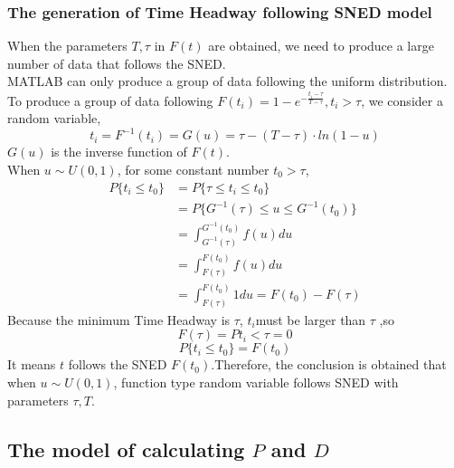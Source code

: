 \documentclass{mcmthesis}
\begin{document}
\subsubsection{The generation of Time Headway following SNED model}
\indent When the parameters $T, \tau $ in $F(t)$ are obtained, we need to produce a large number of data that follows the SNED.\\
\indent MATLAB can only produce a group of data following the uniform distribution. To produce a group of data following $ F(t_{i})=1-e^{-\frac{t_{i}-\tau}{T-\tau}},t_{i}>\tau $, we consider a random variable, 
\begin{equation}
	t_{i}=F^{-1}(t_{i})=G(u)=\tau-(T-\tau)\cdot ln(1-u)
\end{equation}
\indent $G(u)$ is the inverse function of $F(t)$.\\
\indent When $ u \sim U(0,1) $, for some constant number $t_{0}>\tau$,\\
\begin{equation}
\begin{split}
	P\{t_{i}\leqslant t_{0}\}&=P\{\tau\leqslant t_{i} \leqslant t_{0} \}\\
&=P\{ G^{-1}(\tau)\leqslant u \leqslant G^{-1}(t_{0})\}\\
&=\int_{G^{-1}(\tau)}^{G^{-1}(t_{0})}f(u)du\\
&=\int_{F(\tau)}^{F(t_{0})}f(u)du\\
&=\int_{F(\tau)}^{F(t_{0})}1du=F(t_{0})-F(\tau)
\end{split}
\end{equation}
\indent Because the minimum Time Headway is $\tau$, $ t_{i} $must be larger than $\tau$ ,so\\
\begin{equation}
	F(\tau)=P{t_{i}<\tau}=0
\end{equation}
\begin{equation}
	P\{t_{i} \leqslant t_{0} \}=F(t_{0})
\end{equation}
\indent It means $t$ follows the SNED $F(t_{0})$.Therefore, the conclusion is obtained that when $ u \sim U(0,1) $, function type random variable follows SNED with parameters $\tau , T $. \\

\subsection{The model of calculating $P$ and $D$}
\end{document}
